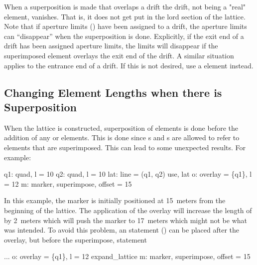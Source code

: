 When a superposition is made that overlaps a drift the drift, not
being a "real" element, vanishes. That is, it does not get put in the
lord section of the lattice.  Note that if aperture limits
() have been assigned to a drift, the aperture limits
can ``disappear'' when the superposition is done. Explicitly, if the
exit end of a drift has been assigned aperture limits, the limits will
disappear if the superimposed element overlays the exit end of the
drift. A similar situation applies to the entrance end of a drift. If
this is not desired, use a  element instead.

\subsection{}
\label{s:super.length}

\subsection{Changing Element Lengths when there is Superposition}
\label{s:super.length}

When the lattice is constructed, superposition of elements is done
before the addition of any  or  elements. This
is done since s and s are allowed to refer
to elements that are superimposed. This can lead to some unexpected
results. For example:
\begin{example}
  q1: quad, l = 10
  q2: quad, l = 10
  lat: line = (q1, q2)
  use, lat
  o: overlay = \{q1\}, l = 12
  m: marker, superimpose, offset = 15
\end{example} 
In this example, the marker is initially positioned at 15~meters from
the beginning of the lattice.  The application of the overlay will
increase the length of  by 2~meters which will push the marker
 to 17~meters which might not be what was intended. To avoid
this problem, an  statement () can
be placed after the overlay, but before the superimpose, statement
\begin{example}
  ...
  o: overlay = \{q1\}, l = 12
  expand_lattice
  m: marker, superimpose, offset = 15
\end{example} 

